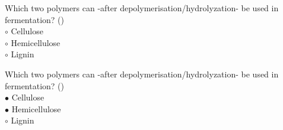 \documentclass[]{beamer}
\begin{document}
\begin{CJK}{UTF8}{gbsn}
\begin{frame}[shrink] {}
\addtocounter{questions}{1}
\color{blue}
Which two polymers can -after depolymerisation/hydrolyzation- be used in fermentation?
({})\\
\color{black}
\setlength{\parindent}{-0.4cm}
{\color{red}$\circ$}  Cellulose  \\
{\color{red}$\circ$}  Hemicellulose  \\
{\color{red}$\circ$} Lignin  \\
\end{frame}
\begin{frame}[shrink] {}
\addtocounter{answers}{1}
\color{blue}
Which two polymers can -after depolymerisation/hydrolyzation- be used in fermentation?
({})\\
\color{black}
\setlength{\parindent}{-0.4cm}
{\color{red}$\bullet$} Cellulose  \\
{\color{red}$\bullet$} Hemicellulose  \\
{\color{red}$\circ$} Lignin  \\
\end{frame}



\end{CJK}
\end{document}
